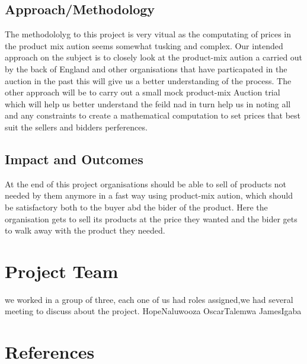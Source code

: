 \documentclass[11pt]{article} %
\begin{document}
\subsection{Approach/Methodology} 
The methodololyg to this project is very vitual as the computating of prices in the product mix aution seems somewhat tusking and complex. 
Our intended approach on the subject is to closely look at the product-mix aution a  carried out by the back of England and other organisations that have particapated in the auction in the past this will give us a better understanding of the process. 
The other approach will be to carry out a small mock product-mix Auction trial which will help us better understand the feild nad in turn help us in noting all and any constraints to create a mathematical computation to set prices that best suit the sellers and bidders perferences.


\subsection{Impact and Outcomes}
At the end of this project organisations should be able to sell of products not needed by them anymore in a fast way using product-mix aution, which should be satisfactory both to the buyer abd the bider of the product. Here the organisation gets to sell its products at the price they wanted and the bider gets to walk away with the product they needed.
\section{Project Team}
we worked in a group of three, each one of us had roles assigned,we had several meeting to discuss about the project. 
HopeNaluwooza
OscarTalemwa
JamesIgaba
\section{References}
\end{document}

